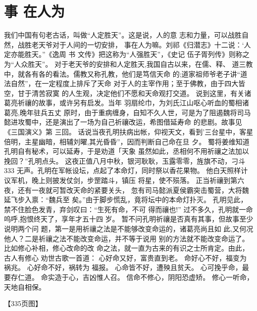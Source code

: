 \section{事 在人为}
我们中国有句老古话，叫做“人定胜天”。这是说，人的意
志和力量，可以战胜自然，战胜老天爷对于人间的一切安排，
事在人为嘛。刘祁《归潜志》十二说：‘人定亦能胜天。”《逸周
书  文传》把这称为“人强胜天”，《史记  伍子胥列传》则称之
为“人众胜天”。
对于老天爷的安排和人定胜天,我国自古以来，在儒、释、
道三教中，就各有各的看法。儒教又称孔教，他们是笃信天命
的;道家祖师爷老子讲“道法自然”，在一定程度上排斥了天命
对于人的主宰作用；至于佛教，由于四大皆空，甘于清苦寂寞
的人生观，决定他们不愿和天命观打交道。
说到这里，有关诸葛亮祈禳的故事，或许另有启发。当年
羽扇纶巾，为刘氏江山呕心听血的蜀相诸葛亮,晚年驻兵五丈
原时，由于重病缠身，自知不久人世，可是为了阻遏魏将司马
懿进攻蜀中，还是演出了一场为自己祈禳改运，希图借延寿命
的悲剧。故事见《三国演义》第 三回。
话说当夜孔明扶病出帐，仰视天文，看到'三台星中，客星
倍明，主星幽暗，相辅刘曜,其光昏昏”，因而判断自己命在旦
夕。
蜀将姜维知道孔明自有秘术，可以延寿，于是劝道「天象
虽然如此，丞相何不用祈禳之法加以挽回？”孔明点头。
这夜正值八月中秋，银河耿耿，玉露零零，旌旗不动，刁斗
 333 
无声。孔明在军帐设坛，点起了本命灯，同时祭以香花果物。
他白天照样计议军机，晚上则披发仗剑，步罡踏斗，镇压
将星，使不殒落。
正当祈禳到第六夜，还有一夜就可暂改天命的紧要关头，
忽有司马懿派夏侯霸突击蜀营，大将魏延飞步入禀：“魏兵至
矣。”由于脚步慌乱，竟将坛中的本命灯扑灭。
孔明见此，禁不住脸色发青，弃剑叹曰：“生死有命，不可
得而禳也!”
过不多久，孔明就一命呜呼,抱恨终天了，享年才五十四
岁。
暂不问孔明祈禳是否真有其事，但故事至少说明两个问
题，第一是用祈禳之法是不能够改变命运的，诸葛亮尚且如
此,又何况他人？二是祈禳之法不能改变命运，并不等于说用
别的方法就不能改变命运了。比如修心补相，修心改命的改
命之法，就一直为古来的有识之士所肯定。由此，古人有修心
劝世古歌一首道：
心好命又好，富贵直到老。
命好心不好，福变为 祸兆。
心好命不好，祸转为 福报。
心命皆不好，遭殃且贫夭。
心可挽乎命，最要存仁道。
命实造于心，吉凶惟人召。
信命不修心，阴阳恐虚矫。
修心一听命，天地自相保。

【335页图】

